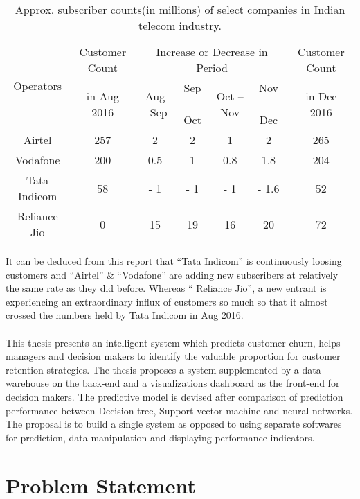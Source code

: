 \begin{table}[H]
\hskip-1.5cm
\begin{tabular}{|c|c|c|c|c|c|c|}
	\hline
	\multirow{2}{3em}{Operators} & Customer Count & \multicolumn{4}{c|}{Increase or Decrease in Period} & Customer Count\\
	& in Aug 2016 & Aug - Sep & Sep – Oct & Oct – Nov & Nov – Dec & in Dec 2016\\\hline
	Airtel & 257 & 2 & 2 & 1 & 2 & 265	\\\hline
	Vodafone & 200 & 0.5 & 1 & 0.8 & 1.8 & 204	\\\hline
	Tata Indicom & 58 & - 1 & - 1 & - 1 & - 1.6 & 52	\\\hline
	Reliance Jio & 0 & 15 & 19 & 16 & 20 & 72	\\\hline
	
\end{tabular}
\caption{Approx. subscriber counts(in millions) of select companies in Indian telecom industry.}
\label{table:1}
\end{table}

It can be deduced from this report that ``Tata Indicom'' is continuously loosing customers and ``Airtel'' \& ``Vodafone'' are adding new subscribers at relatively the same rate as they did before. Whereas `` Reliance Jio'', a new entrant is experiencing an extraordinary influx of customers so much so that it almost crossed the numbers held by Tata Indicom in Aug 2016.
\\
\\
This thesis presents an intelligent system which predicts customer churn, helps managers and decision makers to identify the valuable proportion for customer retention strategies. The thesis proposes a system supplemented by a data warehouse on the back-end and a visualizations dashboard as the front-end for decision makers. The predictive model is devised after comparison of prediction performance between Decision tree, Support vector machine and  neural networks. The proposal is to build a single system as opposed to using separate softwares for prediction, data manipulation and displaying performance indicators. 



\section{Problem Statement}

